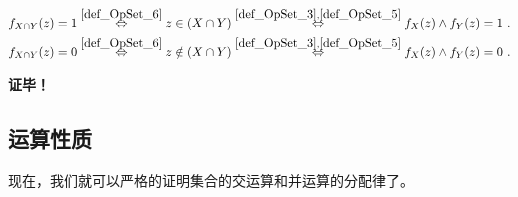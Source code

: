 \begin{equation}
\begin{aligned}
&f_{X\cap Y}(z)=1\overset{\autoref{def_OpSet_6} }{\Leftrightarrow} z\in (X\cap  Y)\overset{\autoref{def_OpSet_3} ,\autoref{def_OpSet_5} }{\Leftrightarrow}f_X(z)\land f_Y(z)=1~.\\
&f_{X\cap Y}(z)=0\overset{\autoref{def_OpSet_6} }{\Leftrightarrow} z\notin (X\cap  Y)\overset{\autoref{def_OpSet_3} ,\autoref{def_OpSet_5} }{\Leftrightarrow}f_X(z)\land f_Y(z)=0~.\\
\end{aligned}
\end{equation}

\textbf{证毕！}


\subsection{运算性质}
现在，我们就可以严格的证明集合的交运算和并运算的分配律了。

